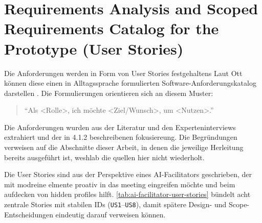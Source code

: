 \section{Requirements Analysis and Scoped Requirements Catalog for the Prototype (User Stories)}
\label{sec:requirements-analysis}

Die Anforderungen werden in Form von User Stories festgehaltens Laut Ott können diese
einen in Alltagssprache formulierten Software-Anforderungskatalog darstellen
\cite[p.~18]{ottAppsEffektivManagen2019}. Die Formulierungen orientieren sich an diesem Muster:
\begin{quote}
  \enquote{Als <Rolle>, ich möchte <Ziel/Wunsch>, um <Nutzen>.}
  \cite[p.~18]{ottAppsEffektivManagen2019}
\end{quote}

Die Anforderungen wurden aus der Literatur und den Experteninterviews extrahiert und der in 4.1.2
beschreibenen fokusiereung. Die Begründungen verweisen auf die Abschnitte dieser Arbeit, in denen die
jeweilige Herleitung bereits ausgeführt ist, weshlab die quellen hier nicht wiederholt.

Die User Stories sind aus der Perspektive eines AI-Facilitators geschrieben, der mit modreine elmente proativ
in das meeting eingreifen möchte und beim aufdecken von hidden profiles hilft.
\autoref{tab:ai-facilitator-user-stories} bündelt acht zentrale Stories mit stabilen IDs (\texttt{US1}--\texttt{US8}),
damit spätere Design- und Scope-Entscheidungen eindeutig darauf verweisen können.

\newcommand{\usid}[1]{%
  \refstepcounter{us}%
\textbf{US\theus}\label{#1}}
\newcommand{\usref}[1]{US\ref{#1}}
\newcommand{\usblocksep}{%
  \addlinespace[0.35em]
  \midrule
\addlinespace[0.55em]}

